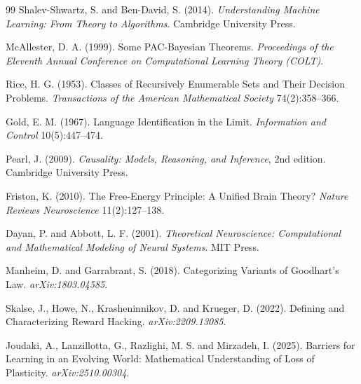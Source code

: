 \begin{thebibliography}{99}
Shalev-Shwartz, S. and Ben-David, S. (2014). \textit{Understanding Machine
Learning: From Theory to Algorithms}. Cambridge University Press.

McAllester, D. A. (1999). Some PAC-Bayesian Theorems. \textit{Proceedings of
the Eleventh Annual Conference on Computational Learning Theory (COLT)}.

Rice, H. G. (1953). Classes of Recursively Enumerable Sets and Their Decision
Problems. \textit{Transactions of the American Mathematical Society}
74(2):358--366.

Gold, E. M. (1967). Language Identification in the Limit.
\textit{Information and Control} 10(5):447--474.

Pearl, J. (2009). \textit{Causality: Models, Reasoning, and Inference}, 2nd
edition. Cambridge University Press.

Friston, K. (2010). The Free-Energy Principle: A Unified Brain Theory?
\textit{Nature Reviews Neuroscience} 11(2):127--138.

Dayan, P. and Abbott, L. F. (2001). \textit{Theoretical Neuroscience:
Computational and Mathematical Modeling of Neural Systems}. MIT Press.

Manheim, D. and Garrabrant, S. (2018). Categorizing Variants of Goodhart's Law.
\textit{arXiv:1803.04585}.

Skalse, J., Howe, N., Krasheninnikov, D. and Krueger, D. (2022). Defining and
Characterizing Reward Hacking. \textit{arXiv:2209.13085}.

Joudaki, A., Lanzillotta, G., Razlighi, M. S. and Mirzadeh, I. (2025). Barriers
for Learning in an Evolving World: Mathematical Understanding of Loss of
Plasticity. \textit{arXiv:2510.00304}.

\end{thebibliography}
